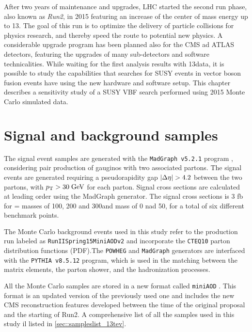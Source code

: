 

After two years of maintenance and upgrades, LHC started the second run phase, also known as \textit{Run2}, in 2015 featuring an increase of the center of mass energy up to 13\tev. The goal of this run is to optimize the delivery of particle collisions for physics research, and thereby speed the route to potential new physics. A considerable upgrade program has been planned also for the CMS ad ATLAS detectors, featuring the upgrades of many sub-detectors and software technicalities. While waiting for the first analysis results with 13\tev data, it is possible to study the capabilities that searches for SUSY events in vector boson fusion events have using the new hardware and software setup. This chapter describes a sensitivity study of a SUSY VBF search performed using 2015 Monte Carlo simulated data.

\section{Signal and background samples}

The signal event samples are generated with the \texttt{MadGraph v5.2.1} program \cite{Alwall:2011uj}, considering pair production of gauginos with two associated partons. The signal events are generated requiring a pseudorapidity gap $|\Delta\eta| > 4.2$ between the two partons, with $p_{\text{T}} > 30\;\text{Ge}\kern-0.06667em\text{V}$ for each parton. Signal cross sections are calculated at leading order using the MadGraph generator. The signal cross sections is $3$ fb for \charginopm = \neutralinotwo masses of 100, 200 and 300\gev and \neutralinoone mass of 0 nad 50\gev, for a total of six different benchmark points.

The Monte Carlo background events used in this study refer to the production run labeled as \texttt{RunIISpring15MiniAODv2} and incorporate the \texttt{CTEQ10} \cite{Dulat:2013hea} parton distribution functions (PDF).The \texttt{POWHEG} and \texttt{MadGraph} generators are interfaced with the \texttt{PYTHIA v8.5.12} \cite{Sjostrand:2006za} program, which is used in the matching between the matrix elements, the parton shower, and the hadronization processes. 

All the Monte Carlo samples are stored in a new format called \texttt{miniAOD} \cite{bib:WorkBookMiniAOD}. This format is an updated version of the previously used one and includes the new CMS reconstruction features developed between the time of the original proposal and the starting of Run2. A comprehensive list of all the samples used in this study il listed in \autoref{sec::sampleslist_13tev}.

